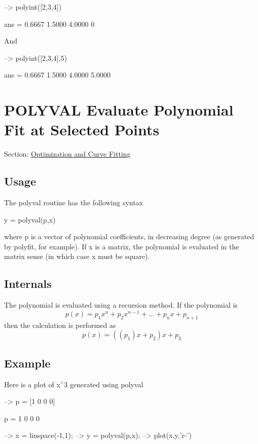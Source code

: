 \begin{DoxyVerbInclude}
--> polyint([2,3,4])

ans = 
    0.6667    1.5000    4.0000         0 
\end{DoxyVerbInclude}


And


\begin{DoxyVerbInclude}
--> polyint([2,3,4],5)

ans = 
    0.6667    1.5000    4.0000    5.0000 
\end{DoxyVerbInclude}
 \hypertarget{curvefit_polyval}{}\section{P\-O\-L\-Y\-V\-A\-L Evaluate Polynomial Fit at Selected Points}\label{curvefit_polyval}
Section\-: \hyperlink{sec_curvefit}{Optimization and Curve Fitting} \hypertarget{vtkwidgets_vtkxyplotwidget_Usage}{}\subsection{Usage}\label{vtkwidgets_vtkxyplotwidget_Usage}
The {\ttfamily polyval} routine has the following syntax \begin{DoxyVerb}  y = polyval(p,x)
\end{DoxyVerb}
 where {\ttfamily p} is a vector of polynomial coefficients, in decreasing degree (as generated by {\ttfamily polyfit}, for example). If {\ttfamily x} is a matrix, the polynomial is evaluated in the matrix sense (in which case {\ttfamily x} must be square). \hypertarget{transforms_svd_Function}{}\subsection{Internals}\label{transforms_svd_Function}
The polynomial is evaluated using a recursion method. If the polynomial is \[ p(x) = p_1 x^n + p_2 x^{n-1} + \dots + p_n x + p_{n+1} \] then the calculation is performed as \[ p(x) = ((p_1) x + p_2) x + p_3 \] \hypertarget{variables_struct_Example}{}\subsection{Example}\label{variables_struct_Example}
Here is a plot of {\ttfamily x$^\wedge$3} generated using polyval


\begin{DoxyVerbInclude}
--> p = [1 0 0 0]

p = 
 1 0 0 0 

--> x = linspace(-1,1);
--> y = polyval(p,x);
--> plot(x,y,'r-')
\end{DoxyVerbInclude}


